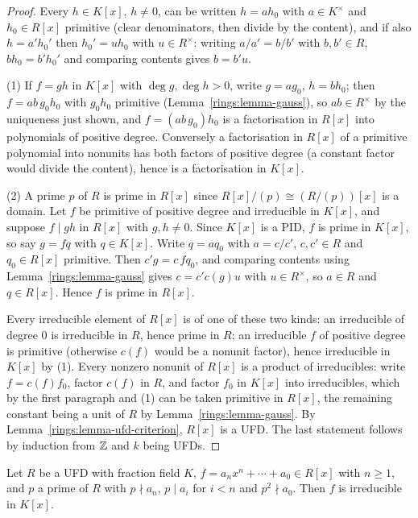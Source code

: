 \begin{proof}
Every $h \in K[x]$, $h \neq 0$, can be written $h = a h_0$ with $a \in K^\times$ and
$h_0 \in R[x]$ primitive (clear denominators, then divide by the content), and if also
$h = a' h_0'$ then $h_0' = u h_0$ with $u \in R^\times$: writing $a/a' = b/b'$ with $b, b' \in R$,
$b h_0 = b' h_0'$ and comparing contents gives $b = b'u$.

(1) If $f = gh$ in $K[x]$ with $\deg g, \deg h > 0$, write $g = ag_0$, $h = bh_0$; then
$f = ab\, g_0h_0$ with $g_0h_0$ primitive (Lemma~\ref{rings:lemma-gauss}), so $ab \in R^\times$ by
the uniqueness just shown, and $f = (ab\, g_0)h_0$ is a factorisation in $R[x]$ into
polynomials of positive degree. Conversely a factorisation in $R[x]$ of a primitive
polynomial into nonunits has both factors of positive degree (a constant factor would
divide the content), hence is a factorisation in $K[x]$.

(2) A prime $p$ of $R$ is prime in $R[x]$ since $R[x]/(p) \cong (R/(p))[x]$ is a domain. Let
$f$ be primitive of positive degree and irreducible in $K[x]$, and suppose $f \mid gh$ in
$R[x]$ with $g, h \neq 0$. Since $K[x]$ is a PID, $f$ is prime in $K[x]$, so say $g = fq$ with
$q \in K[x]$. Write $q = aq_0$ with $a = c/c'$, $c, c' \in R$ and $q_0 \in R[x]$ primitive. Then
$c'g = c\,fq_0$, and comparing contents using Lemma~\ref{rings:lemma-gauss} gives
$c = c'c(g)u$ with $u \in R^\times$, so $a \in R$ and $q \in R[x]$. Hence $f$ is prime in $R[x]$.

Every irreducible element of $R[x]$ is of one of these two kinds: an irreducible of degree
$0$ is irreducible in $R$, hence prime in $R$; an irreducible $f$ of positive degree is
primitive (otherwise $c(f)$ would be a nonunit factor), hence irreducible in $K[x]$ by (1).
Every nonzero nonunit of $R[x]$ is a product of irreducibles: write $f = c(f) f_0$, factor
$c(f)$ in $R$, and factor $f_0$ in $K[x]$ into irreducibles, which by the first paragraph
and (1) can be taken primitive in $R[x]$, the remaining constant being a unit of $R$ by
Lemma~\ref{rings:lemma-gauss}. By Lemma~\ref{rings:lemma-ufd-criterion}, $R[x]$ is a UFD.
The last statement follows by induction from $\mathbb{Z}$ and $k$ being UFDs.
\end{proof}

\begin{proposition}\label{rings:proposition-eisenstein}
Let $R$ be a UFD with fraction field $K$, $f = a_nx^n + \cdots + a_0 \in R[x]$ with $n \geq 1$,
and $p$ a prime of $R$ with $p \nmid a_n$, $p \mid a_i$ for $i < n$ and $p^2 \nmid a_0$. Then $f$ is
irreducible in $K[x]$.
\end{proposition}

